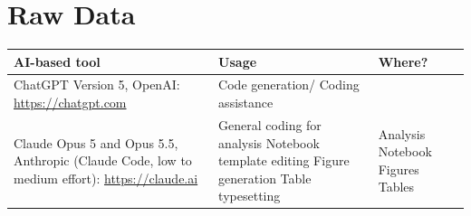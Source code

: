 \FloatBarrier
\section{Raw Data}

\begin{table}[htbp]
\centering
\footnotesize  %
\renewcommand{\arraystretch}{1.6}
\setlength{\tabcolsep}{8pt}
\begin{tabular}{|p{7.2cm}|p{4.2cm}|p{3.0cm}|}
\hline
\textbf{AI-based tool} & \textbf{Usage} & \textbf{Where?} \\ \hline
ChatGPT Version 5, OpenAI: \url{https://chatgpt.com} & Code generation/ Coding assistance &   \\ \hline
Claude Opus 5 and Opus 5.5, Anthropic (Claude Code, low to medium effort): \url{https://claude.ai} & General coding for analysis \newline Notebook template editing \newline Figure generation \newline Table typesetting & Analysis \newline Notebook \newline Figures \newline Tables \\ \hline
\end{tabular}
\label{tab:ai-tools}
\end{table}

\FloatBarrier